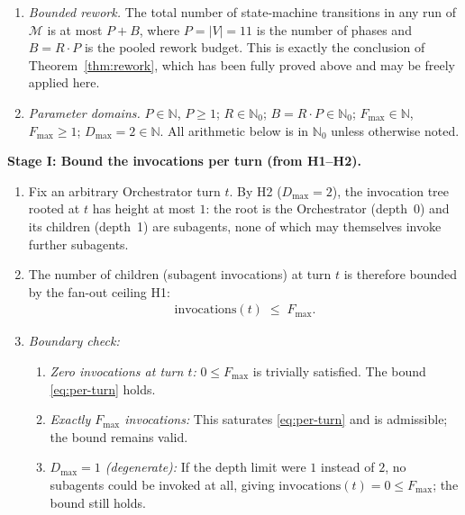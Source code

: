 \documentclass[12pt]{article}
\theoremstyle{definition}
\begin{document}
\begin{enumerate}
    \item[H4] \emph{Bounded rework.}  The total number of state-machine
              transitions in any run of $\mathcal{M}$ is at most $P + B$,
              where $P = |V| = 11$ is the number of phases and
              $B = R \cdot P$ is the pooled rework budget.  This is
              exactly the conclusion of Theorem~\ref{thm:rework}, which
              has been fully proved above and may be freely applied here.

    \item[H5] \emph{Parameter domains.}
              $P \in \mathbb{N}$, $P \geq 1$;
              $R \in \mathbb{N}_{0}$;
              $B = R \cdot P \in \mathbb{N}_{0}$;
              $F_{\max} \in \mathbb{N}$, $F_{\max} \geq 1$;
              $D_{\max} = 2 \in \mathbb{N}$.
              All arithmetic below is in $\mathbb{N}_{0}$ unless
              otherwise noted.
\end{enumerate}

\medskip
\noindent\textbf{Stage I: Bound the invocations per turn (from H1--H2).}
\begin{enumerate}
    \item[I.1] Fix an arbitrary Orchestrator turn $t$.  By H2
               ($D_{\max}=2$), the invocation tree rooted at $t$ has
               height at most $1$: the root is the Orchestrator (depth~0)
               and its children (depth~1) are subagents, none of which
               may themselves invoke further subagents.
    \item[I.2] The number of children (subagent invocations) at turn $t$
               is therefore bounded by the fan-out ceiling H1:
               \begin{align}
                   \label{eq:per-turn}
                   \text{invocations}(t) \;\leq\; F_{\max}.
               \end{align}
    \item[I.3] \emph{Boundary check:}
               \begin{enumerate}
                   \item[I.3a] \emph{Zero invocations at turn $t$:}
                               $0 \leq F_{\max}$ is trivially satisfied.
                               The bound \eqref{eq:per-turn} holds.
                   \item[I.3b] \emph{Exactly $F_{\max}$ invocations:}
                               This saturates \eqref{eq:per-turn} and is
                               admissible; the bound remains valid.
                   \item[I.3c] \emph{$D_{\max}=1$ (degenerate):}
                               If the depth limit were $1$ instead of $2$,
                               no subagents could be invoked at all, giving
                               $\text{invocations}(t)=0 \leq F_{\max}$;
                               the bound still holds.
               \end{enumerate}
\end{enumerate}
\end{document}
